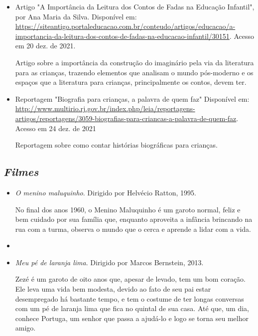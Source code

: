 \documentclass[11pt]{extarticle}
\begin{document}
\begin{itemize}
\item Artigo "A Importância da Leitura dos Contos de Fadas na Educação Infantil", por Ana Maria da Silva. Disponível em: \url{https://siteantigo.portaleducacao.com.br/conteudo/artigos/educacao/a-importancia-da-leitura-dos-contos-de-fadas-na-educacao-infantil/30151}. 
Acesso em 20 dez. de 2021.

Artigo sobre a importância da construção do imaginário pela via da literatura para as crianças, trazendo elementos que analisam o mundo pós-moderno e os espaços que a literatura para crianças, principalmente os contos, devem ter.

\item Reportagem "Biografia para crianças, a palavra de quem faz" Disponível em: \url{http://www.multirio.rj.gov.br/index.php/leia/reportagens-artigos/reportagens/3059-biografias-para-criancas-a-palavra-de-quem-faz}. Acesso em 24 dez. de 2021

Reportagem sobre como contar histórias biográficas para crianças.

\end{itemize}

\subsection{\textit{Filmes}}

\begin{itemize}
\item \textit{O menino maluquinho}. Dirigido por Helvécio Ratton, 1995.

No final dos anos 1960, o Menino Maluquinho é um garoto normal, feliz e bem cuidado por sua família que, enquanto aproveita a infância brincando na rua com a turma, observa o mundo que o cerca e aprende a lidar com a vida.

\item \item \textit{Meu pé de laranja lima}. Dirigido por Marcos Bernstein, 2013.

Zezé é um garoto de oito anos que, apesar de levado, tem um bom coração. Ele leva uma vida bem modesta, devido ao fato de seu pai estar desempregado há bastante tempo, e tem o costume de ter longas conversas com um pé de laranja lima que fica no quintal de sua casa. Até que, um dia, conhece Portuga, um senhor que passa a ajudá-lo e logo se torna seu melhor amigo.


\end{itemize}
\end{document}
